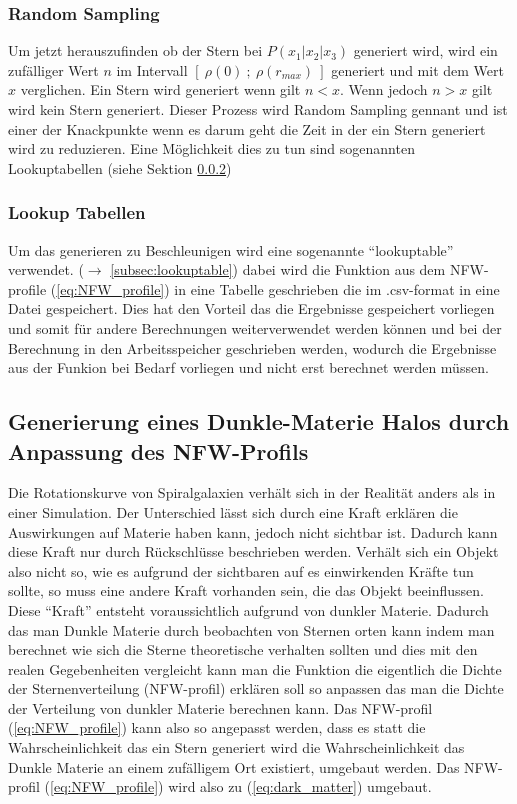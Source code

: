 \subsubsection{Random Sampling}

Um jetzt herauszufinden ob der Stern bei \( P(x_{1} | x_{2} | x_{3}) \) generiert
wird, wird ein zufälliger Wert \( n \) im Intervall
\( [~\rho(0)~;~\rho(r_{max})~] \) generiert und mit dem Wert \( x \)
verglichen.
Ein Stern wird generiert wenn gilt \( n < x \). Wenn jedoch \( n > x \) gilt
wird kein Stern generiert.
Dieser Prozess wird Random Sampling gennant und ist einer der Knackpunkte wenn
es darum geht die Zeit in der ein Stern generiert wird zu reduzieren. Eine
Möglichkeit dies zu tun sind sogenannten Lookuptabellen (siehe Sektion \ref{subsec:lookup})

\subsubsection{Lookup Tabellen} \label{subsec:lookup}

Um das generieren zu Beschleunigen wird eine sogenannte ``lookuptable''
verwendet. (\( \rightarrow \) \ref{subsec:lookuptable}) dabei wird die Funktion
aus dem NFW-profile (\ref{eq:NFW_profile}) in eine Tabelle geschrieben die im
.csv-format in eine Datei gespeichert. Dies hat den Vorteil das die
Ergebnisse gespeichert vorliegen und somit für andere Berechnungen weiterverwendet
werden können und bei der Berechnung in den Arbeitsspeicher geschrieben werden,
wodurch die Ergebnisse aus der Funkion bei Bedarf vorliegen und nicht erst
berechnet werden müssen.

\subsection{Generierung eines Dunkle-Materie Halos durch Anpassung des NFW-Profils}

Die Rotationskurve von Spiralgalaxien verhält sich in der Realität anders als
in einer Simulation. Der Unterschied lässt sich durch eine Kraft erklären
die Auswirkungen auf Materie haben kann, jedoch nicht sichtbar ist. Dadurch
kann diese Kraft nur durch Rückschlüsse beschrieben werden. Verhält sich ein
Objekt also nicht so, wie es aufgrund der sichtbaren auf es einwirkenden Kräfte
tun sollte, so muss eine andere Kraft vorhanden sein, die das Objekt beeinflussen.
Diese ``Kraft'' entsteht voraussichtlich aufgrund von dunkler Materie.
Dadurch das man Dunkle Materie durch beobachten von Sternen orten kann
indem man berechnet wie sich die Sterne theoretische verhalten sollten und dies mit den
realen Gegebenheiten vergleicht kann man die Funktion die eigentlich die Dichte der
Sternenverteilung (NFW-profil) erklären soll so anpassen das man die Dichte der
Verteilung von dunkler Materie berechnen kann.
Das NFW-profil (\ref{eq:NFW_profile}) kann also so angepasst werden, dass es
statt die Wahrscheinlichkeit das ein Stern generiert wird die Wahrscheinlichkeit
das Dunkle Materie an einem zufälligem Ort existiert, umgebaut werden.
Das NFW-profil (\ref{eq:NFW_profile}) wird also zu (\ref{eq:dark_matter})
umgebaut.

